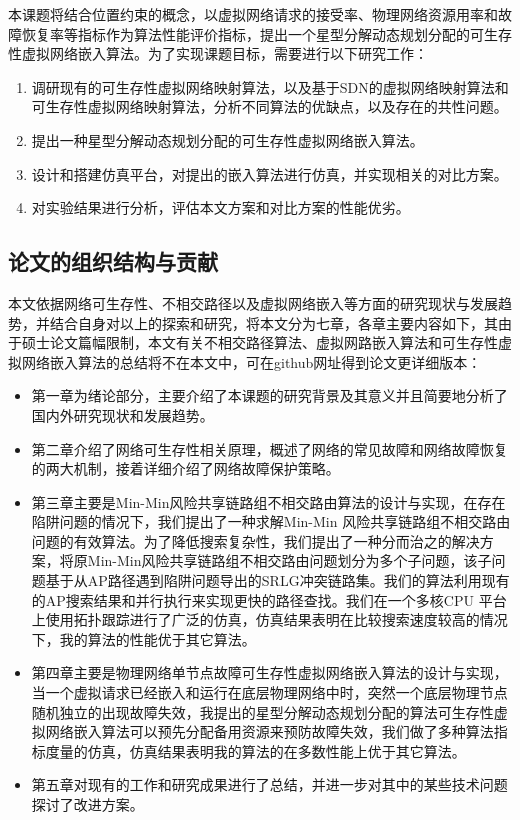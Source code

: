 本课题将结合位置约束的概念，以虚拟网络请求的接受率、物理网络资源用率和故障恢复率等指标作为算法性能评价指标，提出一个星型分解动态规划分配的可生存性虚拟网络嵌入算法。为了实现课题目标，需要进行以下研究工作：
\begin{enumerate}
  \item 调研现有的可生存性虚拟网络映射算法，以及基于SDN的虚拟网络映射算法和可生存性虚拟网络映射算法，分析不同算法的优缺点，以及存在的共性问题。
  \item 提出一种星型分解动态规划分配的可生存性虚拟网络嵌入算法。
  \item 设计和搭建仿真平台，对提出的嵌入算法进行仿真，并实现相关的对比方案。
  \item 对实验结果进行分析，评估本文方案和对比方案的性能优劣。
\end{enumerate}


\subsection{论文的组织结构与贡献}
本文依据网络可生存性、不相交路径以及虚拟网络嵌入等方面的研究现状与发展趋势，并结合自身对以上的探索和研究，将本文分为七章，各章主要内容如下，其由于硕士论文篇幅限制，本文有关不相交路径算法、虚拟网路嵌入算法和可生存性虚拟网络嵌入算法的总结将不在本文中，可在github网址\cite{Thesis}得到论文更详细版本：
\begin{itemize}
  \item 第一章为绪论部分，主要介绍了本课题的研究背景及其意义并且简要地分析了国内外研究现状和发展趋势。
  \item 第二章介绍了网络可生存性相关原理，概述了网络的常见故障和网络故障恢复的两大机制，接着详细介绍了网络故障保护策略。
  \item 第三章主要是Min-Min风险共享链路组不相交路由算法的设计与实现，在存在陷阱问题的情况下，我们提出了一种求解Min-Min 风险共享链路组不相交路由问题的有效算法。为了降低搜索复杂性，我们提出了一种分而治之的解决方案，将原Min-Min风险共享链路组不相交路由问题划分为多个子问题，该子问题基于从AP路径遇到陷阱问题导出的SRLG冲突链路集。我们的算法利用现有的AP搜索结果和并行执行来实现更快的路径查找。我们在一个多核CPU 平台上使用拓扑跟踪进行了广泛的仿真，仿真结果表明在比较搜索速度较高的情况下，我的算法的性能优于其它算法。
  \item 第四章主要是物理网络单节点故障可生存性虚拟网络嵌入算法的设计与实现，当一个虚拟请求已经嵌入和运行在底层物理网络中时，突然一个底层物理节点随机独立的出现故障失效，我提出的星型分解动态规划分配的算法可生存性虚拟网络嵌入算法可以预先分配备用资源来预防故障失效，我们做了多种算法指标度量的仿真，仿真结果表明我的算法的在多数性能上优于其它算法。
  \item 第五章对现有的工作和研究成果进行了总结，并进一步对其中的某些技术问题探讨了改进方案。
\end{itemize}
